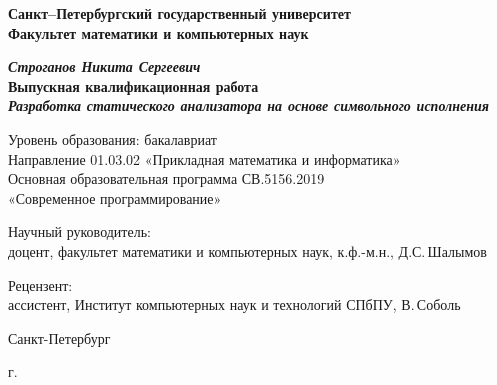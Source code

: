 \begin{titlepage}
\begin{center}

\textbf{Санкт--Петербургский государственный университет}\\
\textbf{Факультет математики и компьютерных наук}


\vspace{35mm}

\textbf{\textit{\large Строганов Никита Сергеевич}} \\[8mm]
\textbf{\large Выпускная квалификационная работа}\\[3mm]
\textbf{\textit{\large Разработка статического анализатора на основе символьного исполнения}}

\vspace{20mm}
Уровень образования: бакалавриат\\
Направление 01.03.02 «Прикладная математика и информатика»\\
Основная образовательная программа СВ.5156.2019\\
«Современное программирование»\\[25mm]
\end{center}

\begin{flushright}
\begin{minipage}[t]{0.65\textwidth}
{Научный руководитель:} \\
доцент, факультет математики и компьютерных наук, к.ф.-м.н., Д.С.\,Шалымов
\vspace{10mm}

{Рецензент:} \\
ассистент, Институт компьютерных наук и технологий СПбПУ, В.\,Соболь
\end{minipage}
\end{flushright}

\vfill

\begin{center}
{Санкт-Петербург}
\par{\the\year{} г.}
\end{center}
\end{titlepage}
\restoregeometry
\addtocounter{page}{1}
